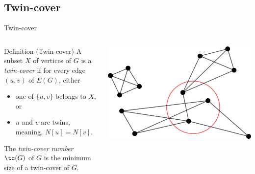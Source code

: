 \documentclass{beamer}
\begin{document}
\subsection{Twin-cover}
\begin{frame}{Twin-cover}
    \begin{columns}
        \begin{column}{0.5\textwidth}
            \begin{block}{Definition (Twin-cover)}
                A subset $X$ of vertices of $G$ is a \emph{twin-cover} if for every edge $(u, v)$ of $E(G)$, either
                \begin{itemize}
                    \item one of $\{u, v\}$ belongs to $X$, or
                    \item $u$ and $v$ are twins, meaning, $N[u] = N[v]$.
                \end{itemize}

                The \emph{twin-cover number} $\tc(G)$ of $G$ is the minimum size of a twin-cover of $G$.
            \end{block}
        \end{column}
        \begin{column}{0.5\textwidth}
            \begin{center}
                \includegraphics[width=\textwidth]{img/twin-cover.png}
            \end{center}
        \end{column}
    \end{columns}
\end{frame}
\end{document}
